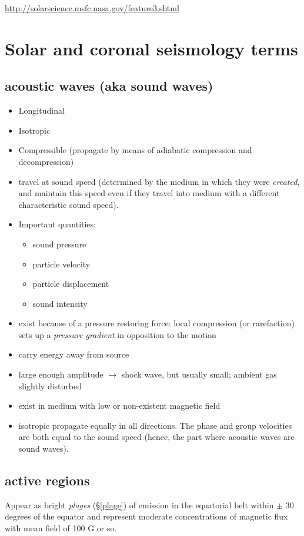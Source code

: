 \documentclass{article}
\begin{document}
\tableofcontents
\url{http://solarscience.msfc.nasa.gov/feature3.shtml}
\newpage

\section{Solar and coronal seismology terms}
\subsection{acoustic waves (aka sound waves)}
\begin{itemize}
    \item Longitudinal
    \item Isotropic
    \item Compressible (propagate by means of adiabatic
        compression and decompression)
    \item travel at sound speed (determined by the medium in which
        they were \emph{created}, and maintain this speed even if they
        travel into medium with a different characteristic sound speed).
    \item Important quantities:
        \begin{itemize}
            \item sound pressure
            \item particle velocity
            \item particle displacement
            \item sound intensity
        \end{itemize}
    \item exist because of a pressure restoring force: local compression
        (or rarefaction) sets up a \emph{pressure gradient} in opposition
        to the motion
    \item carry energy away from source
    \item large enough amplitude $\rightarrow$ shock wave,
        but usually small; ambient gas slightly disturbed
    \item exist in medium with low or non-existent magnetic field
    \item isotropic \- propagate equally in all directions. The phase
        and group velocities are both equal to the sound speed (hence, the
        part where acoustic waves are sound waves).
\end{itemize}

\subsection{active regions}
Appear as bright \textit{plages} (\S \ref{plage})
of emission in the equatorial belt within $\pm$
30 degrees of the equator and represent moderate concentrations of magnetic flux
with mean field of 100 G or so.
\end{document}
